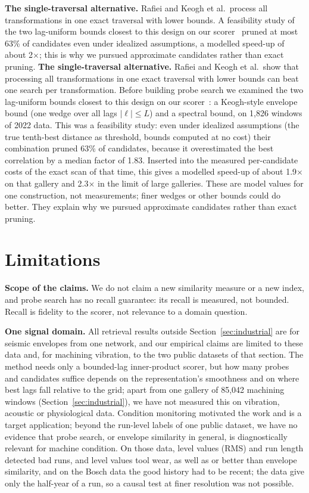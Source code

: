 \documentclass[sigconf]{acmart}
\begin{document}
\ifdefined\SigmodSubmission \textbf{The single-traversal alternative.} Rafiei and Keogh et al.\ process all transformations in one exact traversal with lower bounds. A feasibility study of the two lag-uniform bounds closest to this design on our scorer~\cite{pruning} pruned at most 63\% of candidates even under idealized assumptions, a modelled speed-up of about 2$\times$; this is why we pursued approximate candidates rather than exact pruning.\else
\textbf{The single-traversal alternative.} Rafiei and Keogh et al.\ show that processing all transformations in one exact traversal with lower bounds can beat one search per transformation. Before building probe search we examined the two lag-uniform bounds closest to this design on our scorer~\cite{pruning}: a Keogh-style envelope bound (one wedge over all lags $|\ell|\le L$) and a spectral bound, on 1,826 windows of 2022 data. This was a feasibility study: even under idealized assumptions (the true tenth-best distance as threshold, bounds computed at no cost) their combination pruned 63\% of candidates, because it overestimated the best correlation by a median factor of 1.83. Inserted into the measured per-candidate costs of the exact scan of that time, this gives a modelled speed-up of about 1.9$\times$ on that gallery and 2.3$\times$ in the limit of large galleries. These are model values for one construction, not measurements; finer wedges or other bounds could do better. They explain why we pursued approximate candidates rather than exact pruning.
\fi

\section{Limitations}\label{sec:limits}
\textbf{Scope of the claims.} We do not claim a new similarity measure or a new index, and probe search has no recall guarantee: its recall is measured, not bounded. Recall is fidelity to the scorer, not relevance to a domain question.

\textbf{One signal domain.} All retrieval results outside Section~\ref{sec:industrial} are for seismic envelopes from one network, and our empirical claims are limited to these data and, for machining vibration, to the two public datasets of that section. The method needs only a bounded-lag inner-product scorer, but how many probes and candidates suffice depends on the representation's smoothness and on where best lags fall relative to the grid; apart from one gallery of 85,042 machining windows (Section~\ref{sec:industrial}), we have not measured this on vibration, acoustic or physiological data. Condition monitoring motivated the work and is a target application; beyond the run-level labels of one public dataset, we have no evidence that probe search, or envelope similarity in general, is diagnostically relevant for machine condition. On those data, level values (RMS) and run length detected bad runs, and level values tool wear, as well as or better than envelope similarity, and on the Bosch data the good history had to be recent; the data give only the half-year of a run, so a causal test at finer resolution was not possible.
\end{document}
